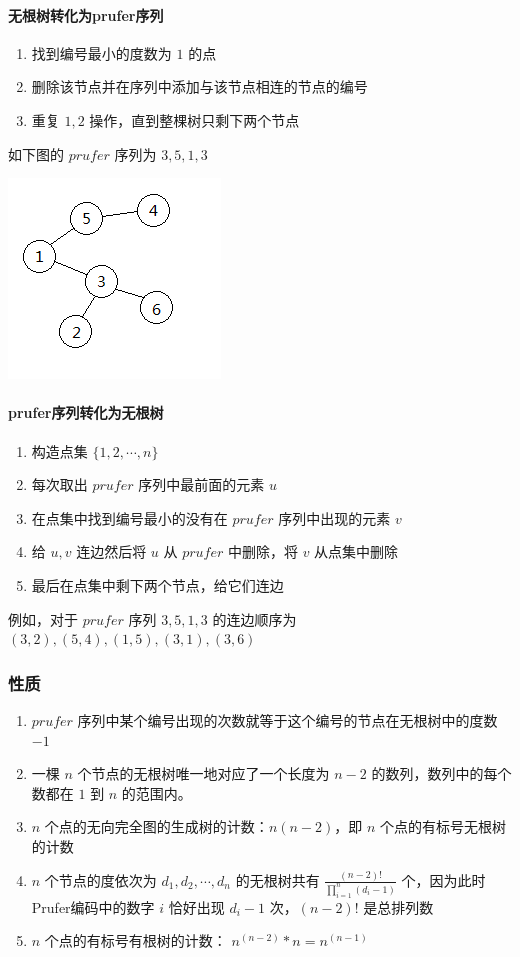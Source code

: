 	\paragraph{无根树转化为prufer序列}
	\begin{enumerate}
		\item 找到编号最小的度数为 $1$ 的点
		\item 删除该节点并在序列中添加与该节点相连的节点的编号
		\item 重复 $1,2$ 操作，直到整棵树只剩下两个节点
	\end{enumerate}
	如下图的 $prufer$ 序列为 $3,5,1,3$
	\begin{center}
		\includegraphics[scale=0.7]{./source/tree.png}
	\end{center}
	\paragraph{prufer序列转化为无根树}
	\begin{enumerate}
		\item 构造点集 $\{1,2,\cdots,n\}$
		\item 每次取出 $prufer$ 序列中最前面的元素 $u$
		\item 在点集中找到编号最小的没有在 $prufer$ 序列中出现的元素 $v$
		\item 给 $u,v$ 连边然后将 $u$ 从 $prufer$ 中删除，将 $v$ 从点集中删除
		\item 最后在点集中剩下两个节点，给它们连边
	\end{enumerate}
	例如，对于 $prufer$ 序列 $3,5,1,3$ 的连边顺序为 $(3,2),(5,4),(1,5),(3,1),(3,6)$\\
	\subsubsection{性质}
	\begin{enumerate}
		\item $prufer$ 序列中某个编号出现的次数就等于这个编号的节点在无根树中的度数 $-1$
		\item 一棵 $n$ 个节点的无根树唯一地对应了一个长度为 $n-2$ 的数列，数列中的每个数都在 $1$ 到 $n$ 的范围内。
		\item $n$ 个点的无向完全图的生成树的计数：$n(n-2)$，即 $n$ 个点的有标号无根树的计数
		\item $n$ 个节点的度依次为 $d_1,d_2,\cdots,d_n$ 的无根树共有 $\displaystyle \frac{(n-2)!}{\prod_{i=1}^{n}(d_i-1)}$ 个，因为此时Prufer编码中的数字 $i$ 恰好出现 $d_i-1$ 次，$(n-2)!$ 是总排列数
		\item $n$ 个点的有标号有根树的计数： $n^{(n-2)}*n = n^{(n-1)}$
	\end{enumerate}

